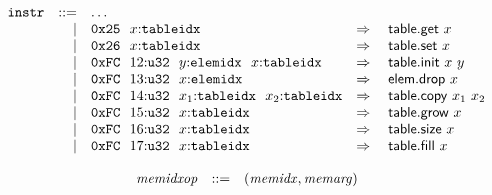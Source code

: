 $$
\begin{array}[t]{@{}lrrl@{}l@{}l@{}l@{}}
& {\mathtt{instr}} & ::= & \dots \\
& & | & \mathtt{0x25}~~x{:}{\mathtt{tableidx}} & \quad\Rightarrow\quad{} & \mathsf{table{.}get}~x \\
& & | & \mathtt{0x26}~~x{:}{\mathtt{tableidx}} & \quad\Rightarrow\quad{} & \mathsf{table{.}set}~x \\
& & | & \mathtt{0xFC}~~12{:}{\mathtt{u32}}~~y{:}{\mathtt{elemidx}}~~x{:}{\mathtt{tableidx}} & \quad\Rightarrow\quad{} & \mathsf{table{.}init}~x~y \\
& & | & \mathtt{0xFC}~~13{:}{\mathtt{u32}}~~x{:}{\mathtt{elemidx}} & \quad\Rightarrow\quad{} & \mathsf{elem{.}drop}~x \\
& & | & \mathtt{0xFC}~~14{:}{\mathtt{u32}}~~x_1{:}{\mathtt{tableidx}}~~x_2{:}{\mathtt{tableidx}} & \quad\Rightarrow\quad{} & \mathsf{table{.}copy}~x_1~x_2 \\
& & | & \mathtt{0xFC}~~15{:}{\mathtt{u32}}~~x{:}{\mathtt{tableidx}} & \quad\Rightarrow\quad{} & \mathsf{table{.}grow}~x \\
& & | & \mathtt{0xFC}~~16{:}{\mathtt{u32}}~~x{:}{\mathtt{tableidx}} & \quad\Rightarrow\quad{} & \mathsf{table{.}size}~x \\
& & | & \mathtt{0xFC}~~17{:}{\mathtt{u32}}~~x{:}{\mathtt{tableidx}} & \quad\Rightarrow\quad{} & \mathsf{table{.}fill}~x \\
\end{array}
$$

\vspace{1ex}

$$
\begin{array}[t]{@{}lrrl@{}l@{}}
& {\mathit{memidxop}} & ::= & ({\mathit{memidx}}, {\mathit{memarg}}) \\
\end{array}
$$

